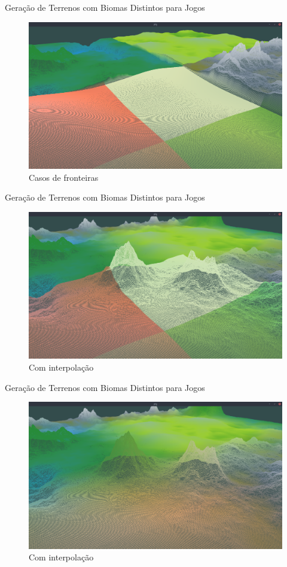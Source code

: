 \begin{frame}{Geração de Terrenos com Biomas Distintos para Jogos}
  \begin{figure}
		\centering
        \includegraphics[width=.8\textwidth]
        {img/uffs/interpolationArea/showareanotinterpo.png}
        \caption{Casos de fronteiras}
  \end{figure}
\end{frame}

\begin{frame}{Geração de Terrenos com Biomas Distintos para Jogos}
  \begin{figure}
		\centering
        \includegraphics[width=.8\textwidth]
        {img/uffs/interpolationArea/showareainterpolating.png}
        \caption{Com interpolação}
  \end{figure}
\end{frame}

\begin{frame}{Geração de Terrenos com Biomas Distintos para Jogos}
  \begin{figure}
		\centering
        \includegraphics[width=.8\textwidth]{img/uffs/interpolationArea/interpolation.png}
        \caption{Com interpolação}
  \end{figure}
\end{frame}


